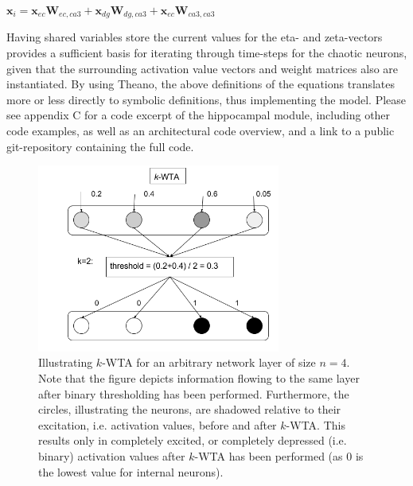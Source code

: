 \begin{center}
\begin{math}
    \textbf{x}_i = \textbf{x}_{ec} \textbf{W}_{ec, ca3} + \textbf{x}_{dg} \textbf{W}_{dg, ca3} + \textbf{x}_{ec} \textbf{W}_{ca3, ca3}
\end{math}
\end{center}

Having shared variables store the current values for the eta- and zeta-vectors provides a sufficient basis for iterating through time-steps for the chaotic neurons, given that the surrounding activation value vectors and weight matrices also are instantiated. By using Theano, the above definitions of the equations translates more or less directly to symbolic definitions, thus implementing the model. Please see appendix C for a code excerpt of the hippocampal module, including other code examples, as well as an architectural code overview, and a link to a public git-repository containing the full code.

\begin{figure}
    \centering
    \includegraphics[width=8cm]{fig/kWTA}
    \caption{Illustrating $k$-WTA for an arbitrary network layer of size $n=4$. Note that the figure depicts information flowing to  the same layer after binary thresholding has been performed. Furthermore, the circles, illustrating the neurons, are shadowed relative to their excitation, i.e. activation values, before and after $k$-WTA. This results only in completely excited, or completely depressed (i.e. binary) activation values after $k$-WTA has been performed (as 0 is the lowest value for internal neurons).}
    \label{fig:k_WTA_illustration}
\end{figure}

